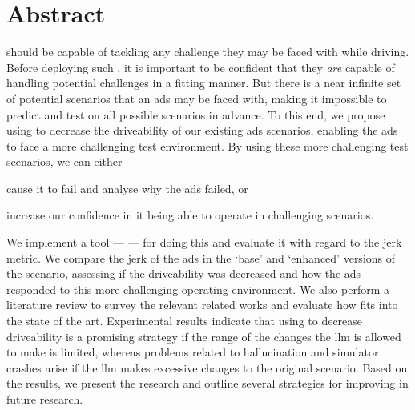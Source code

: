 \chapter*{Abstract}

 should be capable of tackling any challenge they may be faced
with while driving. Before deploying such , it is important to
be confident that they \emph{are} capable of handling potential challenges in a
fitting manner. But there is a near infinite set of potential scenarios that an
\acrshort{ads} may be faced with, making it impossible to predict and test on
all possible scenarios in advance. To this end, we propose using
 to decrease the driveability of our existing \acrshort{ads}
scenarios, enabling the \acrshort{ads} to face a more challenging test
environment. By using these more challenging test scenarios, we can either
\begin{inparaenum}
    \item cause it to fail and analyse why the \acrshort{ads} failed, or
    \item increase our confidence in it being able to operate in challenging scenarios.
\end{inparaenum}
We implement a tool --- \hefe{} --- for doing this and evaluate it with regard
to the jerk metric. We compare the jerk of the \acrshort{ads} in the `base' and
`enhanced' versions of the scenario, assessing if the driveability was decreased
and how the \acrshort{ads} responded to this more challenging operating
environment. We also perform a literature review to survey the relevant related
works and evaluate how \hefe{} fits into the state of the art.
Experimental results indicate that using  to decrease
driveability is a promising strategy if the range of the changes the
\acrshort{llm} is allowed to make is limited, whereas problems related to
hallucination and simulator crashes arise if the \acrshort{llm} makes excessive
changes to the original scenario. Based on the results, we present the research
and outline several strategies for improving \hefe{} in future research.



